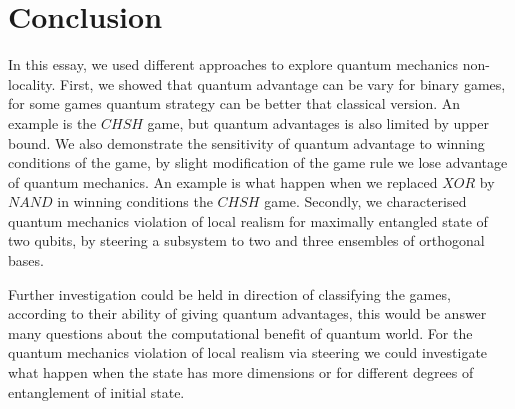 \chapter{Conclusion}
In this essay, we used different approaches to explore quantum mechanics non-locality.
First, we showed that quantum advantage can be vary for binary games, for some games quantum strategy can be better that classical version. An example is the $CHSH$ game, but quantum advantages is also limited by upper bound.
We also demonstrate the  sensitivity of quantum advantage to winning conditions of the game, by slight modification of the game rule we lose  advantage of quantum mechanics. An example is what happen when we  replaced $XOR$ by $NAND$ in winning conditions the $CHSH$ game.
Secondly, we characterised quantum mechanics violation of local realism for maximally entangled state of two qubits, by steering a subsystem to two and three ensembles of orthogonal bases.

Further investigation could be held in direction of classifying the games, according to their ability of giving quantum advantages, this would be answer many questions about the computational benefit of quantum world. For the quantum mechanics violation of local realism via steering we could investigate what happen when the state has more dimensions or for different degrees of entanglement of initial state.
% 